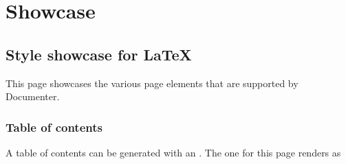 \newcommand{\DocMainTitle}{Documenter LaTeX Showcase}
\newcommand{\DocVersion}{1.2.3}
\newcommand{\DocAuthors}{}
\newcommand{\JuliaVersion}{1.14.0-DEV.1708}




\part{Showcase}


\chapter{Style showcase for \LaTeX}



\label{16100144946555499977}{}


This page showcases the various page elements that are supported by Documenter.



\section{Table of contents}



\label{12007587057822609651}{}


A table of contents can be generated with an .
The one for this page renders as


